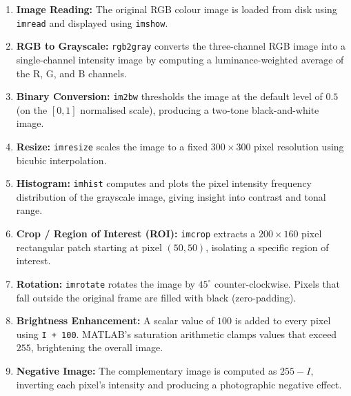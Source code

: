 \documentclass[12pt,a4paper]{article}
\begin{document}
\begin{enumerate}
  \item \textbf{Image Reading:} The original RGB colour image is loaded from
        disk using \texttt{imread} and displayed using \texttt{imshow}.

  \item \textbf{RGB to Grayscale:} \texttt{rgb2gray} converts the three-channel
        RGB image into a single-channel intensity image by computing a
        luminance-weighted average of the R, G, and B channels.

  \item \textbf{Binary Conversion:} \texttt{im2bw} thresholds the image at the
        default level of $0.5$ (on the $[0,1]$ normalised scale), producing a
        two-tone black-and-white image.

  \item \textbf{Resize:} \texttt{imresize} scales the image to a fixed
        $300\times300$ pixel resolution using bicubic interpolation.

  \item \textbf{Histogram:} \texttt{imhist} computes and plots the pixel
        intensity frequency distribution of the grayscale image, giving insight
        into contrast and tonal range.

  \item \textbf{Crop / Region of Interest (ROI):} \texttt{imcrop} extracts a
        $200\times160$ pixel rectangular patch starting at pixel $(50,50)$,
        isolating a specific region of interest.

  \item \textbf{Rotation:} \texttt{imrotate} rotates the image by $45^\circ$
        counter-clockwise. Pixels that fall outside the original frame are
        filled with black (zero-padding).

  \item \textbf{Brightness Enhancement:} A scalar value of $100$ is added to
        every pixel using \texttt{I + 100}. MATLAB's saturation arithmetic
        clamps values that exceed $255$, brightening the overall image.

  \item \textbf{Negative Image:} The complementary image is computed as
        $255 - I$, inverting each pixel's intensity and producing a
        photographic negative effect.
\end{enumerate}

\end{document}
